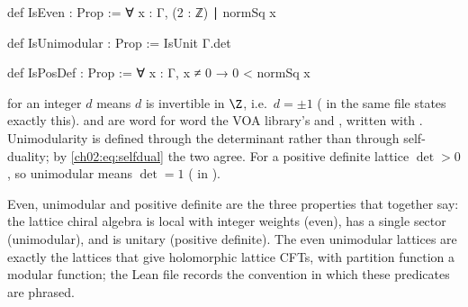 \begin{definition}\label{ch02:def:ebeprops}
\end{definition}
\begin{leancode}
def IsEven : Prop := ∀ x : Γ, (2 : ℤ) ∣ normSq x

def IsUnimodular : Prop := IsUnit Γ.det

def IsPosDef : Prop := ∀ x : Γ, x ≠ 0 → 0 < normSq x
\end{leancode}
\begin{dictionary}
 for an integer $d$ means $d$ is invertible in $\Z$, i.e.\ $d=\pm1$
( in the same file states exactly this).   and
 are word for word the VOA library's  and , written with
.  Unimodularity is defined through the determinant rather than through
self-duality; by \eqref{ch02:eq:selfdual} the two agree.  For a positive definite lattice
$\det>0$, so unimodular means $\det=1$ ( in
).
\end{dictionary}
\begin{physics}
Even, unimodular and positive definite are the three properties that together say: the lattice chiral algebra is local with integer weights (even), has a single sector (unimodular), and is unitary (positive definite). The even unimodular lattices are exactly the lattices that give holomorphic lattice CFTs, with partition function a modular function; the Lean file records the convention in which these predicates are phrased.
\end{physics}

